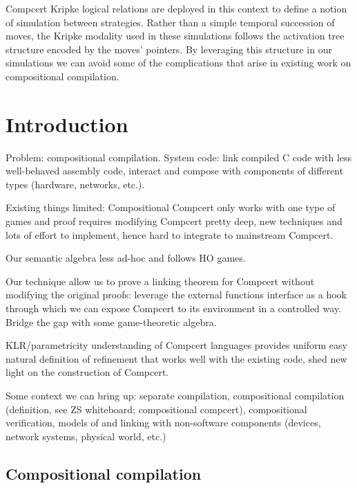\documentclass[sigplan,10pt,review,anonymous]{acmart}
\begin{document}
Compcert Kripke logical relations are deployed in this context
to define a notion of simulation between strategies.
Rather than a simple temporal succession of moves,
the Kripke modality used in these simulations
follows the activation tree structure
encoded by the moves' pointers.
By leveraging this structure in our simulations
we can avoid some of the complications
that arise in existing work on compositional compilation.

\section{Introduction} %

Problem:
compositional compilation.
System code:
link compiled C code with less well-behaved assembly code,
interact and compose with components of different types
(hardware, networks, etc.).

Existing things limited:
Compositional Compcert only works with one type of games
and proof requires modifying Compcert pretty deep,
new techniques and lots of effort to implement,
hence hard to integrate to mainstream Compcert.

Our semantic algebra less ad-hoc and follows HO games.

Our technique allow us to prove a linking theorem for Compcert
without modifying the original proofs:
leverage the external functions interface as a hook
through which we can expose Compcert to its environment in a controlled way.
Bridge the gap with some game-theoretic algebra.

KLR/parametricity understanding of Compcert languages provides
uniform easy natural definition of refinement
that works well with the existing code,
shed new light on the construction of Compcert.

Some context we can bring up:
separate compilation,
compositional compilation (definition, see ZS whiteboard; compositional compcert),
compositional verification,
models of and linking with non-software components
(devices, network systems, physical world, etc.)

\subsection{Compositional compilation}
\end{document}
